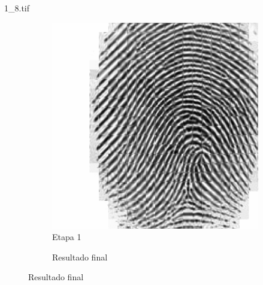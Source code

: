 \documentclass{beamer}
\begin{document}
\begin{frame}{1\_8.tif}
\begin{figure}
\begin{subfigure}[!ht]{0.32\textwidth}
                \includegraphics[width=\columnwidth]{Fingerprints/1_8_intermediate.jpg}
                \caption{Etapa 1}
            \end{subfigure}
            \begin{subfigure}[!ht]{0.32\textwidth}
                \caption{Resultado final}
            \end{subfigure}
        \end{figure}
    \end{frame}

\end{document}
